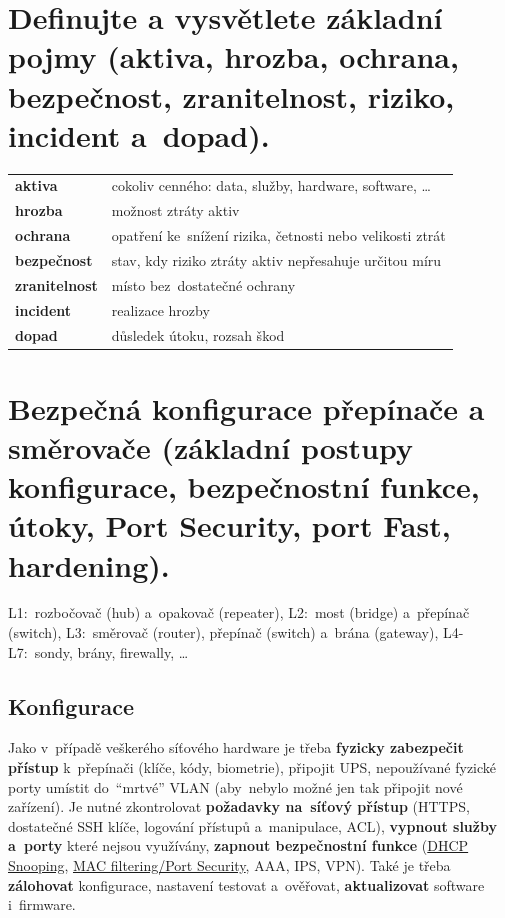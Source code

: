 \section{Definujte a vysvětlete základní pojmy (aktiva, hrozba, ochrana, bezpečnost, zranitelnost, riziko, incident a~dopad).}

\begin{table}[ht]
\begin{tabular}{l|l}
\textbf{aktiva}       & cokoliv cenného: data, služby, hardware, software, \dots \\
\textbf{hrozba}       & možnost ztráty aktiv \\
\textbf{ochrana}      & opatření ke~snížení rizika, četnosti nebo velikosti ztrát \\
\textbf{bezpečnost}   & stav, kdy riziko ztráty aktiv nepřesahuje určitou míru \\
\textbf{zranitelnost} & místo bez~dostatečné ochrany \\
\textbf{incident}     & realizace hrozby \\
\textbf{dopad}        & důsledek útoku, rozsah škod \\
\end{tabular}
\end{table}

\clearpage
\section{Bezpečná konfigurace přepínače a směrovače (základní postupy konfigurace, bezpečnostní funkce, útoky, Port Security, port Fast, hardening).}

L1:~rozbočovač (hub) a~opakovač (repeater), L2:~most (bridge) a~přepínač (switch), L3:~směrovač (router), přepínač (switch) a~brána (gateway), L4-L7:~sondy, brány, firewally, \dots

\subsection{Konfigurace}
\label{question2-1}

Jako v~případě veškerého síťového hardware je třeba \textbf{fyzicky zabezpečit přístup} k~přepínači (klíče, kódy, biometrie), připojit UPS, nepoužívané fyzické porty umístit do~\enquote{mrtvé} VLAN (aby~nebylo možné jen tak připojit nové zařízení). Je nutné zkontrolovat \textbf{požadavky na~síťový přístup} (HTTPS, dostatečné SSH klíče, logování přístupů a~manipulace, ACL), \textbf{vypnout služby a~porty} které nejsou využívány, \textbf{zapnout bezpečnostní funkce} (\href{https://en.wikipedia.org/wiki/DHCP_snooping}{DHCP Snooping}, \href{https://en.wikipedia.org/wiki/MAC_filtering}{MAC filtering/Port Security}, AAA, IPS, VPN). Také je třeba \textbf{zálohovat} konfigurace, nastavení testovat a~ověřovat, \textbf{aktualizovat} software i~firmware.

